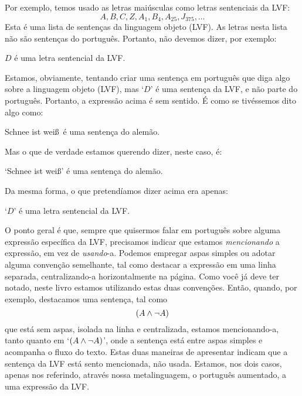 Por exemplo, temos usado as letras maiúsculas como letras sentenciais da LVF:
	$$A, B, C, Z, A_1, B_4, A_{25}, J_{375},\ldots$$
Esta é uma lista de sentenças da linguagem objeto (LVF).
As letras nesta lista não são sentenças do português.
Portanto, não devemos dizer, por exemplo:
	\begin{ebullet}
		\item $D$ é uma letra sentencial da LVF.
	\end{ebullet}
Estamos, obviamente, tentando criar uma sentença em português que diga algo sobre a linguagem objeto (LVF), mas `$D$' é uma sentença da LVF, e não parte do português.
Portanto, a expressão acima é sem sentido.
É como se tivéssemos dito algo como:
	\begin{ebullet}
		\item Schnee ist wei\ss\ é uma sentença do alemão.
	\end{ebullet}
Mas o que de verdade estamos querendo dizer, neste caso, é:
	\begin{ebullet}
		\item `Schnee ist wei\ss' é uma sentença do alemão.
	\end{ebullet}
Da mesma forma, o que pretendíamos dizer acima era apenas:
	\begin{ebullet}
		\item `$D$' é uma letra sentencial da LVF.
	\end{ebullet}
O ponto geral é que, sempre que quisermos falar em português sobre alguma expressão específica da LVF, precisamos indicar que estamos \emph{mencionando} a expressão, em vez de \emph{usando}-a.
Podemos empregar aspas simples ou adotar alguma convenção semelhante, tal como destacar a expressão em uma linha separada, centralizando-a horizontalmente na página.
Como você já deve ter notado, neste livro estamos utilizando estas duas convenções.
Então, quando, por exemplo, destacamos uma sentença, tal como $$(A \wedge \neg A)$$ que está sem aspas, isolada na linha e centralizada, estamos mencionando-a, tanto quanto em `$(A \wedge \neg A)$', onde a sentença está entre aspas simples e acompanha o fluxo do texto.
Estas duas maneiras de apresentar indicam que a sentença da LVF está sento mencionada, não usada.
Estamos, nos dois casos, apenas nos referindo, através nossa metalinguagem, o português aumentado, a uma expressão da LVF.


